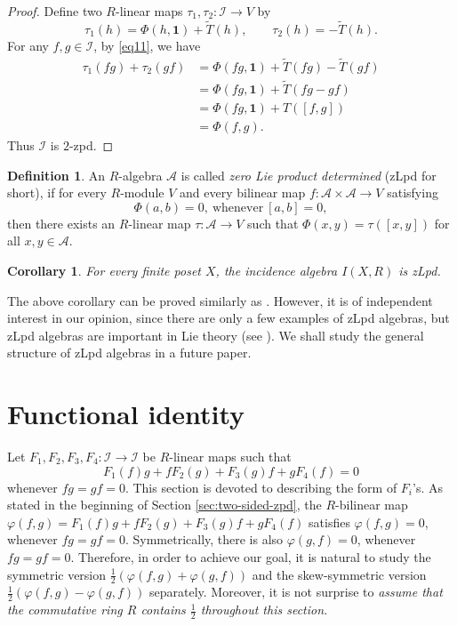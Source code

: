 \documentclass[reqno]{amsart}
\numberwithin{equation}{section}
\theoremstyle{plain}
\newtheorem{corollary}[theorem]{Corollary}
\theoremstyle{definition}
\newtheorem{definition}[theorem]{Definition}
\newcommand{\I}{\mathcal I}
\newcommand{\one}{\mathbf 1}
\begin{document}
\begin{proof}
Define two $R$-linear maps $\tau_1,\tau_2:\I\to V$ by
\[
\tau_1(h)=\Phi(h,\one)+\widetilde T(h),
\qquad
\tau_2(h)=-\widetilde T(h).
\]
For any $f,g\in\I$, by \eqref{eq11}, we have
\[
\begin{aligned}
\tau_1(fg)+\tau_2(gf)
&=\Phi(fg,\one)+\widetilde T(fg)-\widetilde T(gf)\\
&=\Phi(fg,\one)+\widetilde T(fg-gf)\\
&=\Phi(fg,\one)+T([f,g])\\
&=\Phi(f,g).
\end{aligned}
\]
Thus $\I$ is $2$-zpd.
\end{proof}

\begin{definition}
An $R$-algebra $\mathcal A$ is called \emph{zero Lie product determined} (zLpd for short), if for every $R$-module $V$ and every
bilinear map $f:\mathcal A\times \mathcal A\to V$ satisfying
\[
\Phi(a,b)=0,~\text{whenever}~[a,b]=0,
\]
then there exists an $R$-linear map $\tau:\mathcal A\to V$ such that
$\Phi(x,y)=\tau([x,y])$ for all $x,y\in \mathcal A$.
\end{definition}

\begin{corollary}
For every finite poset $X$, the incidence algebra $I(X,R)$ is zLpd.
\end{corollary}

The above corollary can be proved similarly as \cite[Proposition 2.1]{BajukBresar22}.
However, it is of independent interest in our opinion, since there are only a few examples of zLpd algebras,
but zLpd algebras are important in Lie theory (see \cite{BresarZPD21}).
We shall study the general structure of zLpd algebras in a future paper.

\section{Functional identity}\label{sec:functional-identities}

Let $F_1, F_2, F_3, F_4: \I \rightarrow \I$ be $R$-linear maps such that
\[
F_1(f)g+fF_2(g)+F_3(g)f+gF_4(f)=0
\]
whenever $fg=gf=0$. This section is devoted to describing the form of $F_i$'s.
As stated in the beginning of Section \ref{sec:two-sided-zpd}, the $R$-bilinear map $\varphi(f,g)=F_1(f)g+fF_2(g)+F_3(g)f+gF_4(f)$
satisfies $\varphi(f,g)=0$, whenever $fg=gf=0$. Symmetrically, there is also $\varphi(g,f)=0$, whenever $fg=gf=0$.
Therefore, in order to achieve our goal, it is natural to study the symmetric version $\frac{1}{2}(\varphi(f,g)+\varphi(g,f))$
and the skew-symmetric version $\frac{1}{2}(\varphi(f,g)-\varphi(g,f))$ separately.
Moreover, it is not surprise to
{\em assume that the commutative ring $R$ contains $\frac{1}{2}$ throughout this section.}
\end{document}
